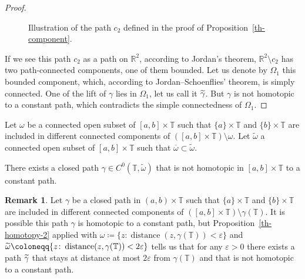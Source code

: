 \documentclass[10pt]{amsart}
\theoremstyle{definition}\newtheorem{defi}[theo]{Definition}\newtheorem{rema}[theo]{Remark}\newtheorem{exam}[theo]{Example}\newtheorem{exem}[theo]{Example}\newtheorem{nota}[theo]{Notation}
\newcommand{\1}{\mathds 1}
\DeclareMathOperator{\distance}{distance}
\newcommand{\R}{\mathbb{R}}
\newcommand{\T}{\mathbb{T}}
\newcommand{\g}{\gamma}
\newcommand{\e}{\varepsilon}
\renewcommand{\o}{\omega}
\renewcommand{\O}{\Omega}
\let\oldtilde\tilde
\renewcommand*{\tilde}[1]{\mathchoice{\widetilde{#1}}{\widetilde{#1}}{\oldtilde{#1}}{\oldtilde{#1}}}
\begin{document}
\begin{proof}
\begin{figure}[ht]
\caption{Illustration of the path $c_2$ defined in the proof of Proposition~\ref{th-component}.}\label{fig:covering}
\end{figure}

If we see this path $c_2$ as a path on $\R^2$, according to Jordan's theorem, $\R^2\setminus c_2$ has two path-connected components, one of them bounded. Let us denote by $\O_1$ this bounded component, which, according to Jordan--Schoenflies' theorem, is simply connected. One of the lift of $\g$ lies in $\O_1$, let us call it $\tilde \g$. But $\g$ is not homotopic to a constant path, which contradicts the simple connectedness of $\O_1$.
\end{proof}

\begin{prop}\label{th-homotopy-2}
Let $\o$ be a connected open subset of $[a,b]\times \T$ such that $\{a\}\times \T$ and $\{b\}\times \T$ are included in different connected components of $([a,b]\times\T) \setminus \o$. Let $\widetilde \o$ a connected open subset of $[a,b]\times \T$ such that $\overline \o \subset \widetilde
\o$.

There exists a closed path $\g \in C^0(\T,\widetilde \o)$ that is not homotopic in $[a,b]\times \T$ to a constant path.
\end{prop}

\begin{rema}\label{rk-homotopy-2}
Let $\g$ be a closed path in $(a,b) \times \T$ such that $\{a\}\times \T$ and $\{b\}\times \T$ are included in different connected components of $([a,b]\times\T) \setminus \g(\T)$. It is possible this path $\g$ is homotopic to a constant path, but Proposition~\ref{th-homotopy-2} applied with $\o \coloneqq \{z\colon \distance(z,\g(\T)) < \e\}$ and $\tilde \o \coloneqq \{z\colon \distance(z,\g(\T)) < 2\e\}$ tells us that for any $\e > 0$ there exists a path $\tilde \g$ that stays at distance at most $2\e$ from $\g(\T)$ and that is not homotopic to a constant path.
\end{rema}
\end{document}
